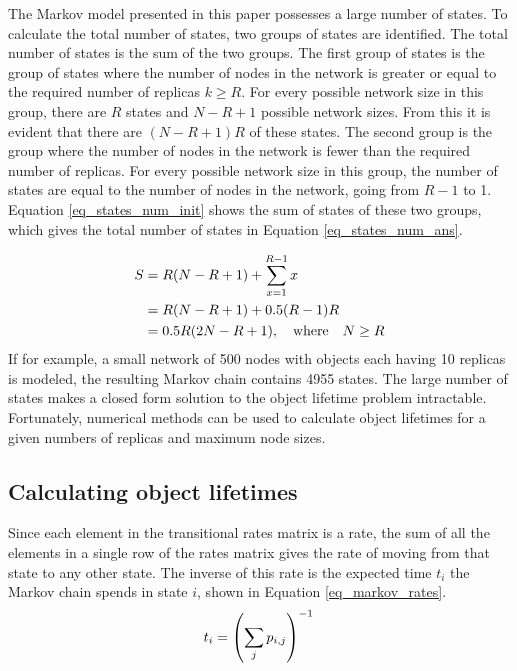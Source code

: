\documentclass[10pt,a4paper,conference]{IEEEtran}
\begin{document}
The Markov model presented in this paper possesses a large number of states. To calculate the total number of states, two groups of states are identified. The total number of states is the sum of the two groups. The first group of states is the group of states where the number of nodes in the network is greater or equal to the required number of replicas $k \geq R$. For every possible network size in this group, there are $R$ states and $N - R + 1$ possible network sizes. From this it is evident that there are $(N - R + 1)R$ of these states. The second group is the group where the number of nodes in the network is fewer than the required number of replicas. For every possible network size in this group, the number of states are equal to the number of nodes in the network, going from $R-1$ to 1. Equation \eqref{eq_states_num_init} shows the sum of states of these two groups, which gives the total number of states in Equation \eqref{eq_states_num_ans}.

\begin{align}
       S & = R(N - R + 1) + \sum_{x=1}^{R-1} x\label{eq_states_num_init}\\
         & = R(N - R + 1) + 0.5 (R - 1) R\notag\\
         & = 0.5 R (2 N - R + 1), \quad\textrm{where}\quad N \geq R \label{eq_states_num_ans}
\end{align}
%
If for example, a small network of 500 nodes with objects each having 10 replicas is modeled, the resulting Markov chain contains 4955 states. The large number of states makes a closed form solution to the object lifetime problem intractable. Fortunately, numerical methods can be used to calculate object lifetimes for a given numbers of replicas and maximum node sizes.

\subsection{Calculating object lifetimes}

Since each element in the transitional rates matrix is a rate, the sum of all the elements in a single row of the rates matrix gives the rate of moving from that state to any other state. The inverse of this rate is the expected time $t_i$ the Markov chain spends in state $i$, shown in Equation \eqref{eq_markov_rates}.
%
\begin{equation} \label{eq_markov_rates}
    t_i = \left(\sum_{j} p_{i, j}\right)^{-1}\\
\end{equation}
\end{document}
